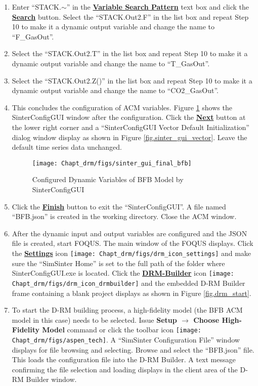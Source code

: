\begin{enumerate}
	\item Enter ``STACK.$\sim$'' in the \textbf{\underline{Variable Search Pattern}} text box and click the \textbf{\underline{Search}} button.  Select the ``STACK.Out2.F'' in the list box and repeat Step 10 to make it a dynamic output variable and change the name to ``F\_GasOut''.
	\item Select the ``STACK.Out2.T'' in the list box and repeat Step 10 to make it a dynamic output variable and change the name to ``T\_GasOut''.
	\item Select the ``STACK.Out2.Z()'' in the list box and repeat Step 10 to make it a dynamic output variable and change the name to ``CO2\_GasOut''.
	\item This concludes the configuration of ACM variables.  Figure \ref{fig.sinter_gui_final_bfb} shows the SinterConfigGUI window after the configuration.  Click the \textbf{\underline{Next}} button at the lower right corner and a ``SinterConfigGUI Vector Default Initialization'' dialog window display as shown in Figure \ref{fig.sinter_gui_vector}.  Leave the default time series data unchanged.
	\begin{figure}[H]
		\begin{center}
			\texttt{[image: Chapt\_drm/figs/sinter\_gui\_final\_bfb]}
			\caption{Configured Dynamic Variables of BFB Model by SinterConfigGUI}
			\label{fig.sinter_gui_final_bfb}
		\end{center}
	\end{figure}
	\item Click the \textbf{\underline{Finish}} button to exit the ``SinterConfigGUI''.  A file named ``BFB.json'' is created in the working directory.  Close the ACM window.
	\item After the dynamic input and output variables are configured and the JSON file is created, start FOQUS.  The main window of the FOQUS displays.  Click the \textbf{\underline{Settings}} icon \texttt{[image: Chapt\_drm/figs/drm\_icon\_settings]} and make sure the ``SimSinter Home'' is set to the full path of the folder where SinterConfigGUI.exe is located.  Click the \textbf{\underline{DRM-Builder}} icon \texttt{[image: Chapt\_drm/figs/drm\_icon\_drmbuilder]} and the embedded D-RM Builder frame containing a blank project displays as shown in Figure \ref{fig.drm_start}.  
	\item To start the D-RM building process, a high-fidelity model (the BFB ACM model in this case) needs to be selected.  Issue \textbf{Setup $\rightarrow$ Choose High-Fidelity Model} command or click the toolbar icon \texttt{[image: Chapt\_drm/figs/aspen\_tech]}.  A ``SimSinter Configuration File'' window displays for file browsing and selecting.  Browse and select the ``BFB.json'' file.  This loads the configuration file into the D-RM Builder.  A text message confirming the file selection and loading displays in the client area of the D-RM Builder window.

\end{enumerate}
